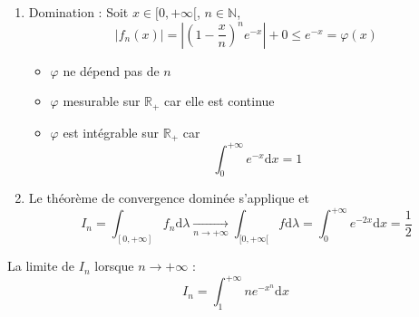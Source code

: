 \begin{solution}
\begin{enumerate}
      \item Domination : Soit $x \in [0, + \infty[$, $n \in \mathbb{N}$, 
        \begin{equation}
          |f_n(x) | = |\left( 1 - \frac{x}{n}  \right) ^{n} e ^{-x} | + 0 \le e ^{-x} = \varphi(x)
        \end{equation}

        \begin{itemize}

            \item {\color{red} $\varphi$ ne dépend pas de $n$}

            \item $\varphi$ mesurable sur $\mathbb{R}_+$ car elle est continue 
            \item $\varphi$ est intégrable sur $\mathbb{R} _+$ car 
              \begin{equation}
                \int_{0}^{+ \infty} e ^{-x} \mathrm{d}x = 1
              \end{equation}

        \end{itemize}

      \item Le théorème de convergence dominée s'applique et 
        \begin{equation}
          I _n = \int_{[0, +\infty]}^{} f_n \mathrm{d}\lambda  \underset{n \to +\infty}{\longrightarrow} \int_{[0, +\infty[}^{} f \mathrm{d} \lambda = \int_{0}^{+ \infty} e ^{-2x} \mathrm{d}x = \frac{1}{2} 
        \end{equation}

    \end{enumerate}
\end{solution}


\begin{Example}{}{}
La limite de $I_n$ lorsque $n \to + \infty$ : 
\begin{equation}
  I_n = \int_{1}^{+ \infty} ne ^{-x ^{n}} \mathrm{d}x
\end{equation}
\end{Example}

